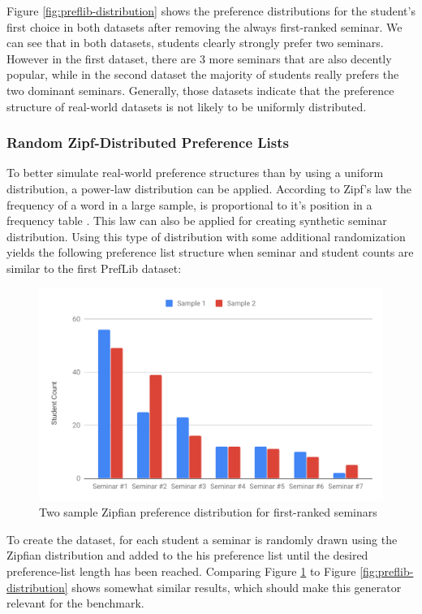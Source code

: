 Figure \ref{fig:preflib-distribution} shows the preference distributions for the student's first choice in both datasets after removing the always first-ranked seminar. We can see that in both datasets, students clearly strongly prefer two seminars. However in the first dataset, there are 3 more seminars that are also decently popular, while in the second dataset the majority of students really prefers the two dominant seminars. Generally, those datasets indicate that the preference structure of real-world datasets is not likely to be uniformly distributed.

\subsubsection{Random Zipf-Distributed Preference Lists}
To better simulate real-world preference structures than by using a uniform distribution, a power-law distribution can be applied. According to Zipf's law the frequency of a word in a large sample, is proportional to it's position in a frequency table \cite{Zipf}. This law can also be applied for creating synthetic seminar distribution. Using this type of distribution with some additional randomization yields the following preference list structure when seminar and student counts are similar to the first PrefLib dataset:

  \begin{figure}[h!]
    \centering
    \includegraphics[width=0.8\linewidth]{assets/plots/zipfian-distr.pdf}
    \caption{Two sample Zipfian preference distribution for first-ranked seminars}
    \label{fig:zipfian-distribution}
\end{figure}

To create the dataset, for each student a seminar is randomly drawn using the Zipfian distribution and added to the his preference list until the desired preference-list length has been reached. Comparing Figure \ref{fig:zipfian-distribution} to Figure \ref{fig:preflib-distribution} shows somewhat similar results, which should make this generator relevant for the benchmark. 

